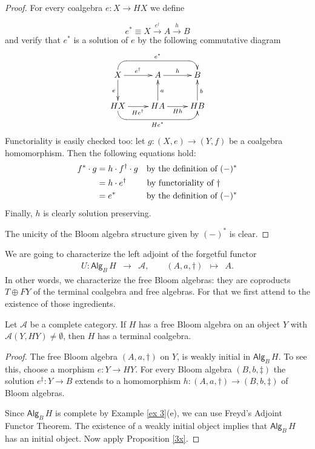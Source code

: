 \documentclass{LMCS}
\theoremstyle{plain}
\theoremstyle{definition}
\numberwithin{equation}{section}
\begin{document}
\begin{proof}
For every coalgebra $e:X\rightarrow HX$ we define

$$e^*\equiv X\stackrel{e^\dagger}\rightarrow A\stackrel{h}\rightarrow B$$
and verify that $e^*$ is a solution of $e$ by the following commutative diagram
 $$
\xymatrix{
X\ar[r]^{e^\dagger}\ar[d]_{e}&A\ar[r]^{h}&B\ar@{<-}`u[l]`[ll]_{e^*}[ll]\\
HX\ar[r]_{He^\dagger}&HA\ar[u]_a\ar[r]_{Hh}&HB\ar[u]_{b}\ar@{<-}`d[l]`[ll]^{He^*}[ll]
}
$$
Functoriality is easily checked too:
let $g:(X,e)\rightarrow (Y,f)$ be a coalgebra homomorphism. Then the following equations hold:
\begin{align}
f^*\cdot g&=h\cdot f^\dagger\cdot g &\text{by the definition of $(-)^*$}\notag\\
&=h\cdot e^\dagger&\text{by functoriality of $\dagger$\qquad}\notag\\
&=e^*&\text{by the definition of $(-)^*$}\notag
\end{align}
Finally, $h$ is clearly solution preserving.

The unicity of the Bloom algebra structure given by $(-)^*$ is clear.
\end{proof}

\begin{rem}
 We are going to characterize the left adjoint of the forgetful functor
\[\begin{array}{cccccc}
U:\mathsf{Alg}_B\,H&\rightarrow &\mathcal A,\qquad
(A,a,\dagger)&\mapsto &A.
\end{array}\]
In other words, we characterize the free Bloom algebras: they are
coproducts $T\oplus FY$ of the terminal coalgebra and free algebras. For that we first attend to the existence of those ingredients.
\end{rem}

\begin{lem}\label{free B-> final coalg}
Let $\mathcal A$ be a complete category. If $H$ has a free Bloom algebra on an object $Y$ with $\mathcal A(Y,HY)\neq \emptyset$, then $H$ has a terminal coalgebra.
\end{lem}
\begin{proof}
The free Bloom algebra $(A,a,\dagger)$ on $Y$, is weakly initial in $\mathsf{Alg}_B\, H$. To see this, choose a morphism $e:Y\rightarrow HY$. For every Bloom algebra $(B,b,\ddag)$ the solution $e^\ddag:Y\rightarrow B$ extends to a homomorphism $h:(A,a,\dagger)\rightarrow (B,b,\ddag)$ of Bloom algebras.


Since $\mathsf{Alg}_B\,H$ is complete by Example \ref{ex 3}(e), we can use Freyd's Adjoint Functor Theorem.
The existence of a weakly initial object implies that $\mathsf{Alg}_B\, H$ has an initial object. Now apply Proposition \ref{3x}.
\end{proof}
\end{document}

